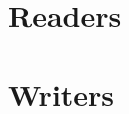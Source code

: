 \documentclass[a4paper, 12pt]{article}
\def\buildMode{buildmissing}
\begin{document}
\begin{landscape}
    \section{Readers}
        \begin{figure}[htb]
            \centering
            
            \caption{}
        \end{figure}
        \clearpage

    \section{Writers}
        \begin{figure}[htb]
            \centering
            
            \caption{}
        \end{figure}
    \end{landscape}

    \nocite{*}
    \printbibliography
\end{document}
